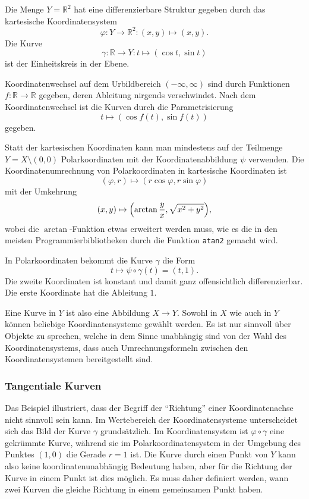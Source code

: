 \begin{beispiel}
Die Menge $Y=\mathbb{R}^2$ hat eine differenzierbare Struktur gegeben durch
das kartesische Koordinatensystem
\[
\varphi
\colon
Y\to\mathbb{R}^2
:
(x,y)\mapsto (x,y).
\]
Die Kurve 
\[
\gamma
\colon
\mathbb{R}\to Y
:
t\mapsto (\cos t, \sin t)
\]
ist der Einheitskreis in der Ebene.

Koordinatenwechsel auf dem Urbildbereich $(-\infty,\infty)$ sind durch
Funktionen $f\colon\mathbb{R}\to\mathbb{R}$ gegeben, deren Ableitung
nirgends verschwindet.
Nach dem Koordinatenwechsel ist die Kurven durch die Parametrisierung
\[
t \mapsto (\cos f(t),\sin f(t))
\]
gegeben.

Statt der kartesischen Koordinaten kann man mindestens auf der Teilmenge
$Y=X\setminus (0,0)$ Polarkoordinaten mit der Koordinatenabbildung $\psi$
verwenden.
Die Koordinatenumrechnung von Polarkoordinaten in kartesische Koordinaten
ist
\[
(\varphi, r) \mapsto (r\cos\varphi,r\sin\varphi)
\]
mit der Umkehrung
\[
(x,y) \mapsto \Bigl(\arctan\frac{y}{x},\sqrt{x^2+y^2}\Bigr),
\]
wobei die $\arctan$-Funktion etwas erweitert werden muss, wie es die
in den meisten Programmierbibliotheken durch die Funktion \texttt{atan2}
gemacht wird.

In Polarkoordinaten bekommt die Kurve $\gamma$ die Form
\[
t\mapsto \psi\circ\gamma(t)
=
(t, 1).
\]
Die zweite Koordinaten ist konstant und damit ganz offensichtlich 
differenzierbar.
Die erste Koordinate hat die Ableitung $1$.
\end{beispiel}

Eine Kurve in $Y$ ist also eine Abbildung $X\to Y$.
Sowohl in $X$ wie auch in $Y$ können beliebige Koordinatensysteme
gewählt werden.
Es ist nur sinnvoll über Objekte zu sprechen, welche in dem
Sinne unabhängig sind von der Wahl des Koordinatensystems, dass
auch Umrechnungsformeln zwischen den Koordinatensystemen bereitgestellt
sind.




\subsubsection{Tangentiale Kurven}
Das Beispiel illustriert, dass der Begriff der ``Richtung'' einer
Koordinatenachse nicht sinnvoll sein kann.
Im Wertebereich der Koordinatensysteme unterscheidet sich das Bild
der Kurve $\gamma$ grundsätzlich.
Im Koordinatensystem ist $\varphi\circ\gamma$ eine gekrümmte Kurve,
während sie im Polarkoordinatensystem in der Umgebung des Punktes
$(1,0)$ die Gerade $r=1$ ist.
Die Kurve durch einen Punkt von $Y$ kann also keine koordinatenunabhängig
Bedeutung haben, aber für die Richtung der Kurve in einem Punkt ist
dies möglich.
Es muss daher definiert werden, wann zwei Kurven die gleiche Richtung
in einem gemeinsamen Punkt haben.


